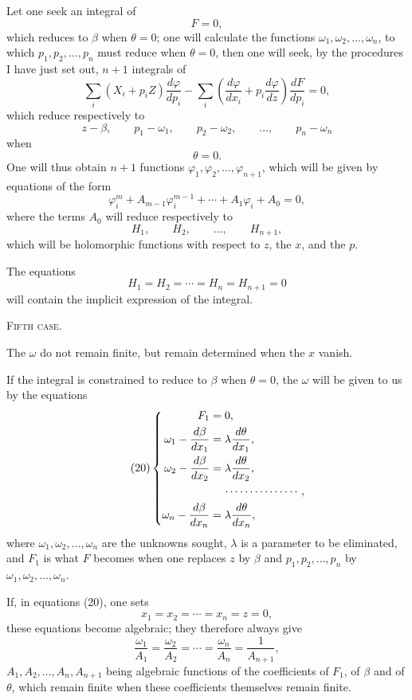 \documentclass[11pt]{article}
\begin{document}
Let one seek an integral of
\[
F=0,
\]
which reduces to $\beta$ when $\theta=0$; one will calculate the functions $\omega_1,\omega_2,\ldots,\omega_n$, to which $p_1,p_2,\ldots,p_n$ must reduce when $\theta=0$, then one will seek, by the procedures I have just set out, $n+1$ integrals of
\[
\sum_i (X_i+p_iZ)\frac{d\varphi}{dp_i}
-\sum_i\left(\frac{d\varphi}{dx_i}+p_i\frac{d\varphi}{dz}\right)\frac{dF}{dp_i}=0,
\]
which reduce respectively to
\[
z-\beta,\qquad p_1-\omega_1,\qquad p_2-\omega_2,\qquad \ldots,\qquad p_n-\omega_n
\]
when
\[
\theta=0.
\]
One will thus obtain $n+1$ functions $\varphi_1,\varphi_2,\ldots,\varphi_{n+1}$, which will be given by equations of the form
\[
\varphi_i^m+A_{m-1}\varphi_i^{m-1}+\cdots+A_1\varphi_i+A_0=0,
\]
where the terms $A_0$ will reduce respectively to
\[
H_1,\qquad H_2,\qquad \ldots,\qquad H_{n+1},
\]
which will be holomorphic functions with respect to $z$, the $x$, and the $p$.

The equations
\[
H_1=H_2=\cdots=H_n=H_{n+1}=0
\]
will contain the implicit expression of the integral.

\begin{center}
{\scshape Fifth case.}
\end{center}

The $\omega$ do not remain finite, but remain determined when the $x$ vanish.

If the integral is constrained to reduce to $\beta$ when $\theta=0$, the $\omega$ will be given to us by the equations
\begin{equation*}\tag{20}
\left\{
\begin{aligned}
F_1&=0,\\
\omega_1-\frac{d\beta}{dx_1}&=\lambda\frac{d\theta}{dx_1},\\
\omega_2-\frac{d\beta}{dx_2}&=\lambda\frac{d\theta}{dx_2},\\
&\hspace{1.2em}\cdots\cdots\cdots\cdots\cdots,\\
\omega_n-\frac{d\beta}{dx_n}&=\lambda\frac{d\theta}{dx_n},
\end{aligned}
\right.
\end{equation*}
where $\omega_1,\omega_2,\ldots,\omega_n$ are the unknowns sought, $\lambda$ is a parameter to be eliminated, and $F_1$ is what $F$ becomes when one replaces $z$ by $\beta$ and $p_1,p_2,\ldots,p_n$ by $\omega_1,\omega_2,\ldots,\omega_n$.

If, in equations (20), one sets
\[
x_1=x_2=\cdots=x_n=z=0,
\]
these equations become algebraic; they therefore always give
\[
\frac{\omega_1}{A_1}=\frac{\omega_2}{A_2}=\cdots=\frac{\omega_n}{A_n}=\frac{1}{A_{n+1}},
\]
$A_1,A_2,\ldots,A_n,A_{n+1}$ being algebraic functions of the coefficients of $F_1$, of $\beta$ and of $\theta$, which remain finite when these coefficients themselves remain finite.
\end{document}
